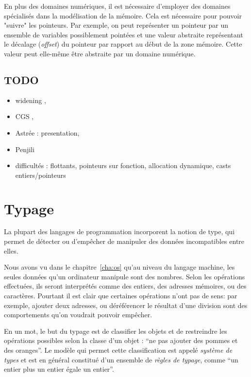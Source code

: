 En plus des domaines numériques, il est nécessaire d'employer des domaines
spécialisés dans la modélisation de la mémoire. Cela est nécessaire pour pouvoir
"suivre" les pointeurs. Par exemple, on peut représenter un pointeur par un
ensemble de variables possiblement pointées et une valeur abstraite représentant
le décalage (\emph{offset}) du pointeur par rapport au début de la zone mémoire.
Cette valeur peut elle-même être abstraite par un domaine numérique.

\subsection*{TODO}

\begin{itemize}
\item widening \cite{granger},
\item CGS \cite{cgs},
\item Astrée : presentation\cite{Astree04,Astree05},
\item Penjili
\item difficultés : flottants, pointeurs sur fonction, allocation dynamique,
  casts entiers/pointeurs
\end{itemize}

\section{Typage}

La plupart des langages de programmation incorporent la notion de type, qui
permet de détecter ou d'empêcher de manipuler des données incompatibles entre
elles.

Nous avons vu dans le chapitre~\ref{cha:os} qu'au niveau du langage machine, les
seules données qu'un ordinateur manipule sont des nombres. Selon les opérations
effectuées, ils seront interprétés comme des entiers, des adresses mémoires, ou
des caractères. Pourtant il est clair que certaines opérations n'ont pas de
sens: par exemple, ajouter deux adresses, ou déréférencer le résultat d'une
division sont des comportements qu'on voudrait pouvoir empêcher.

En un mot, le but du typage est de classifier les objets et de restreindre les
opérations possibles selon la classe d'un objet : ``ne pas ajouter des pommes et
des oranges''. Le modèle qui permet cette classification est appelé
\emph{système de types} et est en général constitué d'un ensemble de
\emph{règles de typage}, comme ``un entier plus un entier égale un entier''.

